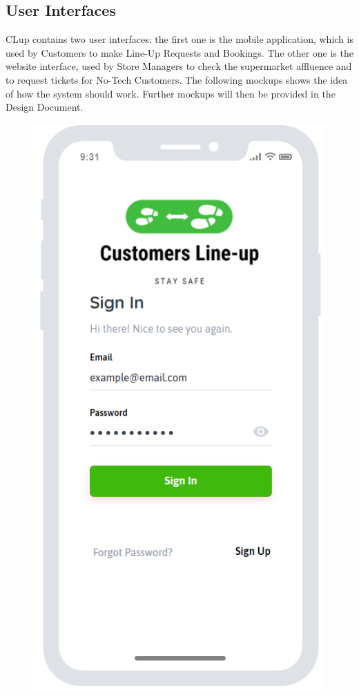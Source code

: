 \subsection{User Interfaces}

CLup contains two user interfaces: the first one is the mobile application, which is used by Customers to make Line-Up Requests and Bookings. The other one is the website interface, used by Store Managers to check the supermarket affluence and to request tickets for No-Tech Customers. The following mockups shows the idea of how the system should work. Further mockups will then be provided in the Design Document. \\
\begin{figure}[H]
\begin{minipage}{0.3\linewidth} 
\includegraphics[width=\textwidth]{./Images/MockupLogo/mockLogin}

\end{minipage}
\end{figure}
